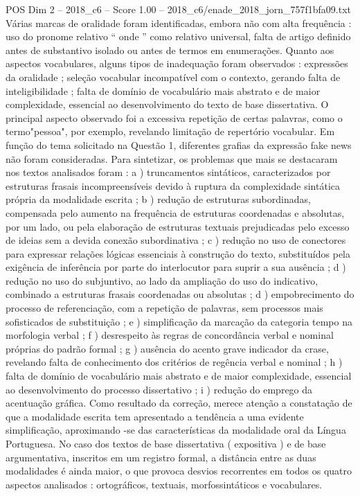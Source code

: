 \begin{textsample}{POS Dim 2 – 2018\_c6 – Score 1.00 – 2018\_c6/enade\_2018\_jorn\_757f1bfa09.txt}
Várias marcas de oralidade foram identificadas, embora não com alta frequência : uso do pronome relativo “ onde ” como relativo universal, falta de artigo definido antes de substantivo isolado ou antes de termos em enumerações.
Quanto aos aspectos vocabulares, alguns tipos de inadequação foram observados : expressões da oralidade ; seleção vocabular incompatível com o contexto, gerando falta de inteligibilidade ; falta de domínio de vocabulário mais abstrato e de maior complexidade, essencial ao desenvolvimento do texto de base dissertativa.
O principal aspecto observado foi a excessiva repetição de certas palavras, como o termo"pessoa", por exemplo, revelando limitação de repertório vocabular.
Em função do tema solicitado na Questão 1, diferentes grafias da expressão fake news não foram consideradas.
Para sintetizar, os problemas que mais se destacaram nos textos analisados foram : a ) truncamentos sintáticos, caracterizados por estruturas frasais incompreensíveis devido à ruptura da complexidade sintática própria da modalidade escrita ; b ) redução de estruturas subordinadas, compensada pelo aumento na frequência de estruturas coordenadas e absolutas, por um lado, ou pela elaboração de estruturas textuais prejudicadas pelo excesso de ideias sem a devida conexão subordinativa ; c ) redução no uso de conectores para expressar relações lógicas essenciais à construção do texto, substituídos pela exigência de inferência por parte do interlocutor para suprir a sua ausência ; d ) redução no uso do subjuntivo, ao lado da ampliação do uso do indicativo, combinado a estruturas frasais coordenadas ou absolutas ; d ) empobrecimento do processo de referenciação, com a repetição de palavras, sem processos mais sofisticados de substituição ; e ) simplificação da marcação da categoria tempo na morfologia verbal ; f ) desrespeito às regras de concordância verbal e nominal próprias do padrão formal ; g ) ausência do acento grave indicador da crase, revelando falta de conhecimento dos critérios de regência verbal e nominal ; h ) falta de domínio de vocabulário mais abstrato e de maior complexidade, essencial ao desenvolvimento do processo dissertativo ; i ) redução do emprego da acentuação gráfica.
Como resultado da correção, merece atenção a constatação de que a modalidade escrita tem apresentado a tendência a uma evidente simplificação, aproximando -se das características da modalidade oral da Língua Portuguesa.
No caso dos textos de base dissertativa ( expositiva ) e de base argumentativa, inscritos em um registro formal, a distância entre as duas modalidades é ainda maior, o que provoca desvios recorrentes em todos os quatro aspectos analisados : ortográficos, textuais, morfossintáticos e vocabulares.

\end{textsample}

